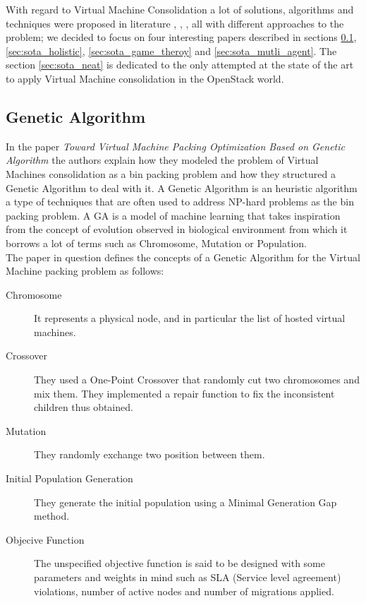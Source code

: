 With regard to Virtual Machine Consolidation a lot of solutions, algorithms and techniques were proposed in literature \cite{He:2012jr}, \cite{Wuhib:2012vq}, \cite{Corradi:2014fe}, all with different approaches to the problem; we decided to focus on four interesting papers described in sections \ref{sec:sota_ga}, \ref{sec:sota_holistic}, \ref{sec:sota_game_theroy} and \ref{sec:sota_mutli_agent}. The section \ref{sec:sota_neat} is dedicated to the only attempted at the state of the art to apply Virtual Machine consolidation in the OpenStack world.

\subsection{Genetic Algorithm}
\label{sec:sota_ga}
In the paper \textit{Toward Virtual Machine Packing Optimization Based on Genetic Algorithm} \cite{Nakada:2009in} the authors explain how they modeled the problem of Virtual Machines consolidation as a bin packing problem and how they structured a Genetic Algorithm to deal with it. A Genetic Algorithm is an heuristic algorithm a type of techniques that are often used to address NP-hard problems as the bin packing problem. A GA is a model of machine learning that takes inspiration from the concept of evolution observed in biological environment from which it borrows a lot of terms such as Chromosome, Mutation or Population.\\
The paper in question defines the concepts of a Genetic Algorithm for the Virtual Machine packing problem as follows:
\begin{description}
  \item[Chromosome] It represents a physical node, and in particular the list of hosted virtual machines.
  \item[Crossover] They used a One-Point Crossover that randomly cut two chromosomes and mix them. They implemented a repair function to fix the inconsistent children thus obtained.
  \item[Mutation] They randomly exchange two position between them.
  \item[Initial Population Generation] They generate the initial population using a Minimal Generation Gap method.
  \item[Objecive Function] The unspecified objective function is said to be designed with some parameters and weights in mind such as SLA (Service level agreement) violations, number of active nodes and number of migrations applied.
\end{description}

